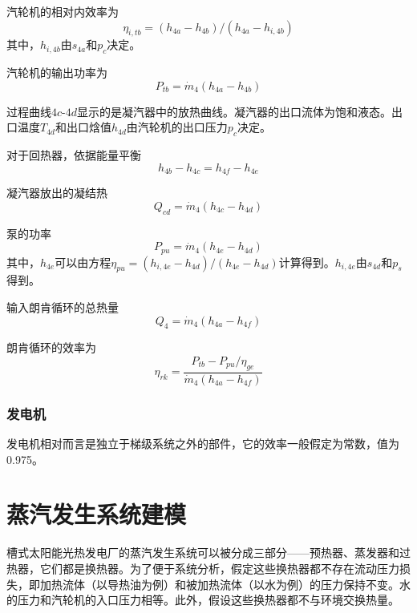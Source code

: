 汽轮机的相对内效率为
\begin{equation}
  \eta_{i,tb} = (h_{4a}-h_{4b})/(h_{4a}-h_{i,4b})
\end{equation}
其中，$h_{i,4b}$由$s_{4a}$和$p_c$决定。

汽轮机的输出功率为
\begin{equation}
  P_{tb}=\dot{m}_{4}(h_{4a}-h_{4b})
\end{equation}

过程曲线$4c$-$4d$显示的是凝汽器中的放热曲线。凝汽器的出口流体为饱和液态。出口温度$T_{4d}$和出口焓值$h_{4d}$由汽轮机的出口压力$p_c$决定。

对于回热器，依据能量平衡
\begin{equation}
  h_{4b} - h_{4c} = h_{4f} - h_{4e}
\end{equation}

凝汽器放出的凝结热
\begin{equation}
  Q_{cd} = \dot{m}_4 (h_{4c} - h_{4d})
\end{equation}

泵的功率
\begin{equation}
P_{pu}=\dot{m}_{4}(h_{4e}-h_{4d})
\end{equation}  
其中，$h_{4e}$可以由方程$\eta_{pu} = (h_{i,4e}-h_{4d})/(h_{4e}-h_{4d})$计算得到。$h_{i,4e}$由$s_{4d}$和$p_s$得到。
    
输入朗肯循环的总热量
\begin{equation}
    Q_4=\dot{m}_4(h_{4a}-h_{4f})
\end{equation}

朗肯循环的效率为
\begin{equation}
	\eta_{rk}=\dfrac{P_{tb}-P_{pu}/\eta_{ge}}{\dot{m}_4(h_{4a}-h_{4f})}
\end{equation}

\subsubsection{发电机}
发电机相对而言是独立于梯级系统之外的部件，它的效率一般假定为常数，值为0.975。

\section{蒸汽发生系统建模}
槽式太阳能光热发电厂的蒸汽发生系统可以被分成三部分——预热器、蒸发器和过热器，它们都是换热器。为了便于系统分析，假定这些换热器都不存在流动压力损失，即加热流体（以导热油为例）和被加热流体（以水为例）的压力保持不变。水的压力和汽轮机的入口压力相等。此外，假设这些换热器都不与环境交换热量。

